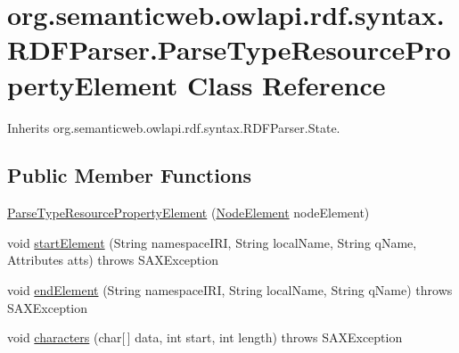 \hypertarget{classorg_1_1semanticweb_1_1owlapi_1_1rdf_1_1syntax_1_1_r_d_f_parser_1_1_parse_type_resource_property_element}{\section{org.\-semanticweb.\-owlapi.\-rdf.\-syntax.\-R\-D\-F\-Parser.\-Parse\-Type\-Resource\-Property\-Element Class Reference}
\label{classorg_1_1semanticweb_1_1owlapi_1_1rdf_1_1syntax_1_1_r_d_f_parser_1_1_parse_type_resource_property_element}
}


Inherits org.\-semanticweb.\-owlapi.\-rdf.\-syntax.\-R\-D\-F\-Parser.\-State.

\subsection*{Public Member Functions}
\begin{DoxyCompactItemize}
\item 
\hyperlink{classorg_1_1semanticweb_1_1owlapi_1_1rdf_1_1syntax_1_1_r_d_f_parser_1_1_parse_type_resource_property_element_a0e7e99dfd930b15f13d2e57ac5e31ac7}{Parse\-Type\-Resource\-Property\-Element} (\hyperlink{classorg_1_1semanticweb_1_1owlapi_1_1rdf_1_1syntax_1_1_r_d_f_parser_1_1_node_element}{Node\-Element} node\-Element)
\item 
void \hyperlink{classorg_1_1semanticweb_1_1owlapi_1_1rdf_1_1syntax_1_1_r_d_f_parser_1_1_parse_type_resource_property_element_ae136269c21feb612dcecd4b16bd573cc}{start\-Element} (String namespace\-I\-R\-I, String local\-Name, String q\-Name, Attributes atts)  throws S\-A\-X\-Exception 
\item 
void \hyperlink{classorg_1_1semanticweb_1_1owlapi_1_1rdf_1_1syntax_1_1_r_d_f_parser_1_1_parse_type_resource_property_element_a3597a24c4b2b4d7d31aaaf4a3f629e1a}{end\-Element} (String namespace\-I\-R\-I, String local\-Name, String q\-Name)  throws S\-A\-X\-Exception 
\item 
void \hyperlink{classorg_1_1semanticweb_1_1owlapi_1_1rdf_1_1syntax_1_1_r_d_f_parser_1_1_parse_type_resource_property_element_a6c777b3b8edf7522f32c2b6ad4c2856f}{characters} (char\mbox{[}$\,$\mbox{]} data, int start, int length)  throws S\-A\-X\-Exception 
\end{DoxyCompactItemize}
